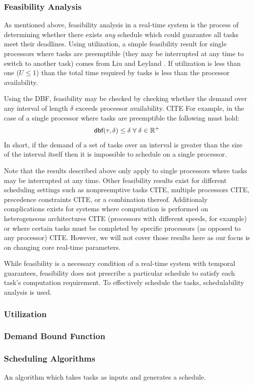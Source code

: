 \subsubsection{Feasibility Analysis}

As mentioned above, feasibility analysis in a real-time system is the process of determining whether there exists \textit{any} schedule which could guarantee all tasks meet their deadlines.
Using utilization, a simple feasibility result for single processors where tasks are preemptible (they may be interrupted at any time to switch to another task) comes from Liu and Leyland \cite{liu_scheduling_1973}.
If utilization is less than one ($U \leq 1$) than the total time required by tasks is less than the processor availability.

Using the DBF, feasibility may be checked by checking whether the demand over any interval of length $\delta$ exceeds processor availability. CITE
For example, in the case of a single processor where tasks are preemptible the following must hold:
\begin{equation}
    \mbox{\sf dbf}(\tau,\delta) \leq \delta \; \forall \; \delta \in \mathbb{R}^+
\end{equation}
In short, if the demand of a set of tasks over an interval is greater than the size of the interval itself then it is impossible to schedule on a single processor.

Note that the results described above only apply to single processors where tasks may be interrupted at any time.
Other feasibility results exist for different scheduling settings such as nonpreemptive tasks CITE, multiple processors CITE, precedence constraints CITE, or a combination thereof.
Additionaly complications exists for systems where computation is performed on heterogeneous architectures CITE (processors with different speeds, for example) or where certain tasks must be completed by specific processors (as opposed to any processor) CITE. 
However, we will not cover those results here as our focus is on changing core real-time parameters.

While feasibility is a necessary condition of a real-time system with temporal guarantees, feasibility does not prescribe a particular schedule to satisfy each task's computation requirement.
To effectively schedule the tasks, schedulability analysis is used.

\subsubsection{Utilization}

\subsubsection{Demand Bound Function}


\subsubsection{Scheduling Algorithms}

An algorithm which takes tasks as inputs and generates a schedule.


